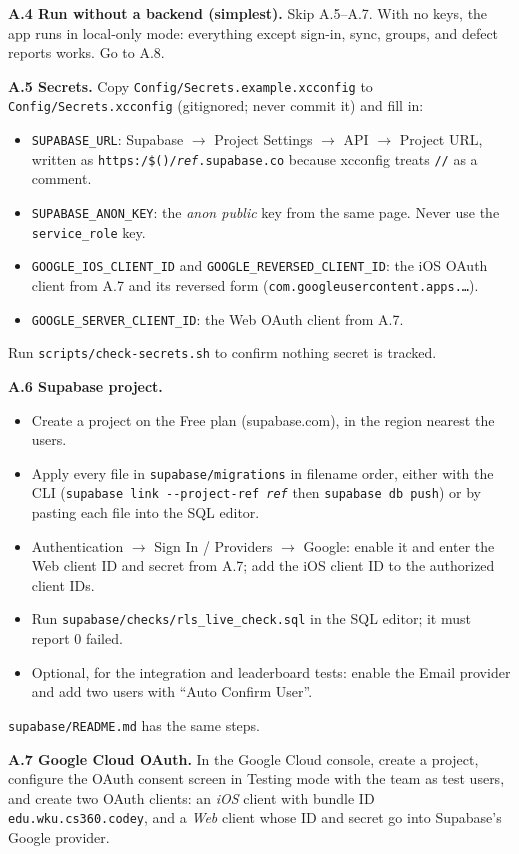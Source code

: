\documentclass[12pt,letterpaper]{article}
\begin{document}
\textbf{A.4 Run without a backend (simplest).} Skip A.5--A.7. With no keys, the app
runs in local-only mode: everything except sign-in, sync, groups, and defect reports
works. Go to A.8.

\textbf{A.5 Secrets.} Copy \texttt{Config/Secrets.example.xcconfig} to
\texttt{Config/Secrets.xcconfig} (gitignored; never commit it) and fill in:
\begin{itemize}
  \item \texttt{SUPABASE\_URL}: Supabase $\to$ Project Settings $\to$ API $\to$ Project
        URL, written as \texttt{https:/\$()/\textit{ref}.supabase.co} because xcconfig
        treats \texttt{//} as a comment.
  \item \texttt{SUPABASE\_ANON\_KEY}: the \emph{anon public} key from the same page.
        Never use the \texttt{service\_role} key.
  \item \texttt{GOOGLE\_IOS\_CLIENT\_ID} and \texttt{GOOGLE\_REVERSED\_CLIENT\_ID}: the
        iOS OAuth client from A.7 and its reversed form
        (\texttt{com.googleusercontent.apps.\ldots}).
  \item \texttt{GOOGLE\_SERVER\_CLIENT\_ID}: the Web OAuth client from A.7.
\end{itemize}
Run \texttt{scripts/check-secrets.sh} to confirm nothing secret is tracked.

\textbf{A.6 Supabase project.}
\begin{itemize}
  \item Create a project on the Free plan (supabase.com), in the region nearest the
        users.
  \item Apply every file in \texttt{supabase/migrations} in filename order, either with
        the CLI (\texttt{supabase link -{}-project-ref \textit{ref}} then
        \texttt{supabase db push}) or by pasting each file into the SQL editor.
  \item Authentication $\to$ Sign In / Providers $\to$ Google: enable it and enter the
        Web client ID and secret from A.7; add the iOS client ID to the authorized
        client IDs.
  \item Run \texttt{supabase/checks/rls\_live\_check.sql} in the SQL editor; it must
        report 0 failed.
  \item Optional, for the integration and leaderboard tests: enable the Email provider
        and add two users with ``Auto Confirm User''.
\end{itemize}
\texttt{supabase/README.md} has the same steps.

\textbf{A.7 Google Cloud OAuth.} In the Google Cloud console, create a project, configure
the OAuth consent screen in Testing mode with the team as test users, and create two
OAuth clients: an \emph{iOS} client with bundle ID \texttt{edu.wku.cs360.codey}, and a
\emph{Web} client whose ID and secret go into Supabase's Google provider.
\end{document}
